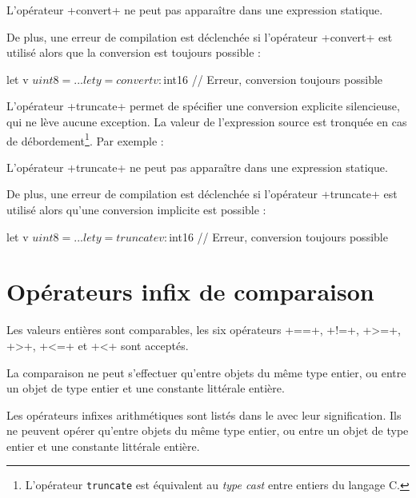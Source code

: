 L'opérateur \plm+convert+ ne peut pas apparaître dans une expression statique.

De plus, une erreur de compilation est déclenchée si l'opérateur \plm+convert+ est utilisé alors que la conversion est toujours possible :
\begin{PLM}
let v $uint8 = ...
let y = convert v : $int16 // Erreur, conversion toujours possible
\end{PLM}


L'opérateur \plm+truncate+ permet de spécifier une conversion explicite silencieuse, qui ne lève aucune exception. La valeur de l'expression source est tronquée en cas de débordement\footnote{L'opérateur \texttt{truncate} est équivalent au \emph{type cast} entre entiers du langage C.}. Par exemple :


L'opérateur \plm+truncate+ ne peut pas apparaître dans une expression statique.

De plus, une erreur de compilation est déclenchée si l'opérateur \plm+truncate+ est utilisé alors qu'une conversion implicite est possible :
\begin{PLM}
let v $uint8 = ...
let y =truncate v : $int16 // Erreur, conversion toujours possible
\end{PLM}

\section{Opérateurs infix de comparaison}

Les valeurs entières sont comparables, les six opérateurs \plm+==+, \plm+!=+, \plm+>=+, \plm+>+, \plm+<=+ et \plm+<+ sont acceptés.

La comparaison ne peut s'effectuer qu'entre objets du même type entier, ou entre un objet de type entier et une constante littérale entière.











Les opérateurs infixes arithmétiques sont listés dans le  avec leur signification. Ils ne peuvent opérer qu'entre objets du même type entier, ou entre un objet de type entier et une constante littérale entière.


